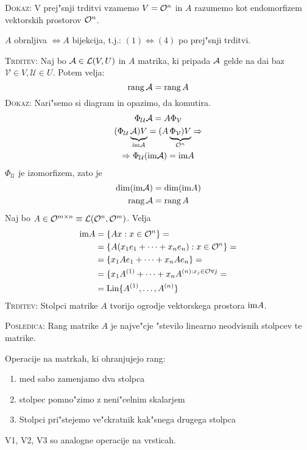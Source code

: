 \textsc{Dokaz:} V prej"snji trditvi vzamemo $V = \mathcal{O}^n$ in $A$ razumemo kot endomorfizem vektorskih prostorov $\mathcal{O}^n$. 

$A$ obrnljiva $\iff A$ bijekcija, t.j.: $(1) \iff (4)$ po prej"snji trditvi.

\textsc{Trditev:} Naj bo $\mathcal{A} \in \mathcal{L}(V, U)$ in $A$ matrika, ki pripada $\mathcal{A}$ gelde na dai baz $\mathcal{V} \in V, \mathcal{U} \in U$. Potem velja:
\begin{equation*}
\operatorname{rang} \mathcal{A} = \operatorname{rang} A
\end{equation*}
\textsc{Dokaz:}
Nari"semo si diagram in opazimo, da komutira.
\begin{gather*}
\Phi_{\mathcal{U}} \mathcal{A} =  A \Phi_{\mathcal{V}} \\
(\Phi_{\mathcal{U}} \underbrace{\mathcal{A}) V}_{\text{im} \mathcal{A}} = (A \underbrace{\Phi_{\mathcal{V}}) V}_{\mathcal{O}^n} \Rightarrow \\
\Rightarrow \Phi_{\mathcal{U}} (\text{im} \mathcal{A}) = \text{im} A
\end{gather*}
$\Phi_{\mathcal{U}}$ je izomorfizem, zato je
\begin{gather*}
\begin{aligned}
\dim (\text{im} \mathcal{A}) &= \dim (\text{im} A) \\
\operatorname{rang} \mathcal{A} &= \operatorname{rang} A
\end{aligned}
\end{gather*}
%
Naj bo $A \in \mathcal{O}^{m \times n} \equiv \mathcal{L}(\mathcal{O}^n, \mathcal{O}^m)$. Velja
\begin{gather*}
\begin{aligned}
\text{im} A &= \{Ax: x \in \mathcal{O}^n\} = \\
&= \{A(x_1 e_1 + \cdots + x_n e_n): x \in \mathcal{O}^n\} = \\
&= \{x_1Ae_1 + \cdots + x_n A e_n\} = \\
&= \{x_1 A^{(1)} + \cdots + x_n A^{(n): x_j \in \mathcal{O} \forall j} = \\
& = \text{Lin} \{A^{(1)}, \ldots, A^{(n)}\}
\end{aligned}
\end{gather*}
\textsc{Trditev:} Stolpci matrike $A$ tvorijo ogrodje vektorskega prostora $\text{im} A$.

\textsc{Posledica:} Rang matrike $A$ je najve"cje "stevilo linearno neodvisnih stolpcev te matrike.

Operacije na matrkah, ki ohranjujejo rang:
\begin{enumerate}[S1)]
	\item  med sabo zamenjamo dva stolpca
	\item stolpec pomno"zimo z neni"celnim skalarjem
	\item Stolpci pri"stejemo ve"ckratnik kak"snega drugega stolpca
\end{enumerate}
V1, V2, V3 so analogne operacije na vrsticah.

